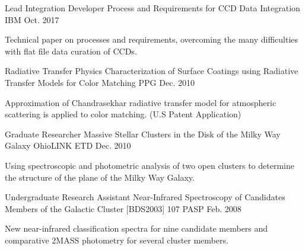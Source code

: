 

\begin{cventries}

  \cventry
    {Lead Integration Developer} %
    {Process and Requirements for CCD Data Integration} %
    {IBM} %
    {Oct. 2017} %
    {
      \begin{cvitems} %
        \item {Technical paper on processes and requirements, overcoming the many difficulties with flat file data curation of CCDs.}
      \end{cvitems}
    }

  \cventry
    {Radiative Transfer Physics} %
    {Characterization of Surface Coatings using Radiative Transfer Models for Color Matching} %
    {PPG} %
    {Dec. 2010} %
    {
      \begin{cvitems} %
        \item {Approximation of Chandrasekhar radiative transfer model for atmospheric scattering is applied to color matching.  (U.S Patent Application)}
      \end{cvitems}
    }

  \cventry
    {Graduate Researcher} %
    {Massive Stellar Clusters in the Disk of the Milky Way Galaxy} %
    {OhioLINK ETD} %
    {Dec. 2010} %
    {
      \begin{cvitems} %
        \item {Using spectroscopic and photometric analysis of two open clusters to determine the structure of the plane of the Milky Way Galaxy.}
      \end{cvitems}
    }

  \cventry
    {Undergraduate Research Assistant} %
    {Near-Infrared Spectroscopy of Candidates Members of the Galactic Cluster [BDS2003] 107} %
    {PASP} %
    {Feb. 2008} %
    {
      \begin{cvitems} %
        \item {New near-infrared classification spectra for nine candidate members and comparative 2MASS photometry for several cluster members.}
      \end{cvitems}
    }

\end{cventries}
